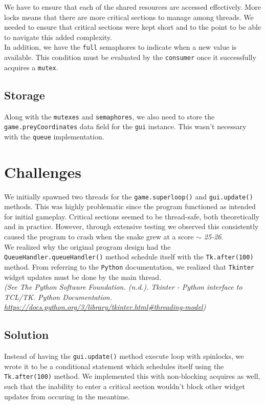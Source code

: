 \documentclass{article}
\begin{document}
We have to ensure that each of the shared resources are accessed effectively. More locks means that there are more critical sections to manage among threads.
We needed to ensure that critical sections were kept short and to the point to be able to navigate this added complexity. \\

In addition, we have the \texttt{full} semaphores to indicate when a new value is available. This condition must be evaluated by the \texttt{consumer} once it successfully acquires a \texttt{mutex}.

\subsection{Storage}

Along with the \texttt{mutexes} and \texttt{semaphores}, we also need to store the \texttt{game.preyCoordinates} data field for the \texttt{gui} instance. This wasn't necessary with the \texttt{queue} implementation.

\section{Challenges}

We initially spawned two threads for the \texttt{game.superloop()} and \texttt{gui.update()} methods.
This was highly problematic since the program functioned as intended for initial gameplay. Critical sections seemed to be thread-safe, both theoretically and in practice.
However, through extensive testing we observed this consistently caused the program to crash when the snake grew at a score $\sim$ \textit{25-26}. \\

We realized why the original program design had the \texttt{QueueHandler.queueHandler()} method schedule itself with the \texttt{Tk.after(100)} method.
From referring to the \texttt{Python} documentation, we realized that \texttt{Tkinter} widget updates must be done by the main thread. \\

\textit{(See The Python Software Foundation. (n.d.). Tkinter - Python interface to TCL/TK. Python Documentation. \href{https://docs.python.org/3/library/tkinter.html\#threading-model}{https://docs.python.org/3/library/tkinter.html\#threading-model})}

\subsection{Solution}

Instead of having the \texttt{gui.update()} method execute loop with spinlocks, we wrote it to be a conditional statement which schedules itself using the \texttt{Tk.after(100)} method.
We implemented this with non-blocking acquires as well, such that the inability to enter a critical section wouldn't block other widget updates from occuring in the meantime.
\end{document}
